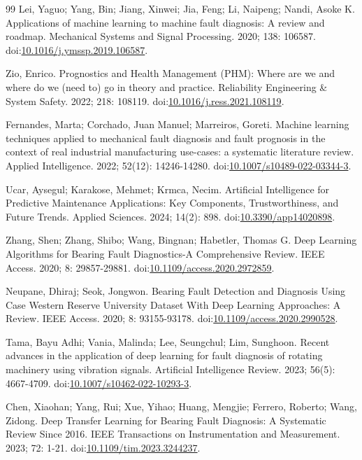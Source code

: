 \documentclass[machines,article,submit,oneauthor]{Definitions/mdpi}
\begin{document}
\begin{thebibliography}{99}
 Lei, Yaguo; Yang, Bin; Jiang, Xinwei; Jia, Feng; Li, Naipeng; Nandi, Asoke K. Applications of machine learning to machine fault diagnosis: A review and roadmap. Mechanical Systems and Signal Processing. 2020; 138: 106587. doi:\url{10.1016/j.ymssp.2019.106587}.

 Zio, Enrico. Prognostics and Health Management (PHM): Where are we and where do we (need to) go in theory and practice. Reliability Engineering \& System Safety. 2022; 218: 108119. doi:\url{10.1016/j.ress.2021.108119}.

 Fernandes, Marta; Corchado, Juan Manuel; Marreiros, Goreti. Machine learning techniques applied to mechanical fault diagnosis and fault prognosis in the context of real industrial manufacturing use-cases: a systematic literature review. Applied Intelligence. 2022; 52(12): 14246-14280. doi:\url{10.1007/s10489-022-03344-3}.

 Ucar, Aysegul; Karakose, Mehmet; Krmca, Necim. Artificial Intelligence for Predictive Maintenance Applications: Key Components, Trustworthiness, and Future Trends. Applied Sciences. 2024; 14(2): 898. doi:\url{10.3390/app14020898}.

 Zhang, Shen; Zhang, Shibo; Wang, Bingnan; Habetler, Thomas G. Deep Learning Algorithms for Bearing Fault Diagnostics-A Comprehensive Review. IEEE Access. 2020; 8: 29857-29881. doi:\url{10.1109/access.2020.2972859}.

 Neupane, Dhiraj; Seok, Jongwon. Bearing Fault Detection and Diagnosis Using Case Western Reserve University Dataset With Deep Learning Approaches: A Review. IEEE Access. 2020; 8: 93155-93178. doi:\url{10.1109/access.2020.2990528}.

 Tama, Bayu Adhi; Vania, Malinda; Lee, Seungchul; Lim, Sunghoon. Recent advances in the application of deep learning for fault diagnosis of rotating machinery using vibration signals. Artificial Intelligence Review. 2023; 56(5): 4667-4709. doi:\url{10.1007/s10462-022-10293-3}.

 Chen, Xiaohan; Yang, Rui; Xue, Yihao; Huang, Mengjie; Ferrero, Roberto; Wang, Zidong. Deep Transfer Learning for Bearing Fault Diagnosis: A Systematic Review Since 2016. IEEE Transactions on Instrumentation and Measurement. 2023; 72: 1-21. doi:\url{10.1109/tim.2023.3244237}.


\end{thebibliography}
\end{document}
